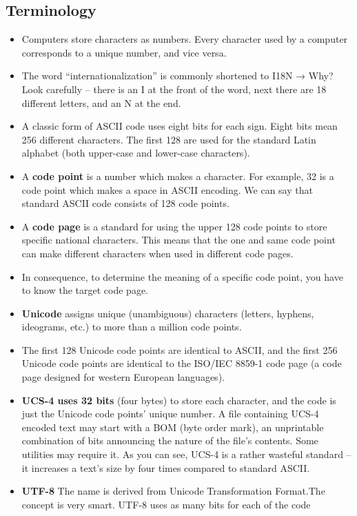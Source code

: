 \documentclass[11pt]{article}
\begin{document}
\subsection{Terminology}
\label{sec:orgfbbca46}
\begin{itemize}
\item Computers store characters as numbers. Every character used by a
computer corresponds to a unique number, and vice versa.
\item The word “internationalization” is commonly shortened to I18N → Why?
Look carefully – there is an I at the front of the word, next there
are 18 different letters, and an N at the end.
\item A classic form of ASCII code uses eight bits for each sign. Eight
bits mean 256 different characters. The first 128 are used for the
standard Latin alphabet (both upper-case and lower-case characters).
\item A \textbf{code point} is a number which makes a character. For example, 32
is a code point which makes a space in ASCII encoding. We can say
that standard ASCII code consists of 128 code points.
\item A \textbf{code page} is a standard for using the upper 128 code points to
store specific national characters. This means that the one and same
code point can make different characters when used in different code
pages.
\item In consequence, to determine the meaning of a specific code point,
you have to know the target code page.
\item \textbf{Unicode} assigns unique (unambiguous) characters (letters, hyphens,
ideograms, etc.) to more than a million code points.
\item The first 128 Unicode code points are identical to ASCII, and the
first 256 Unicode code points are identical to the ISO/IEC 8859-1
code page (a code page designed for western European languages).
\item \textbf{UCS-4 uses 32 bits} (four bytes) to store each character, and the
code is just the Unicode code points’ unique number. A file
containing UCS-4 encoded text may start with a BOM (byte order
mark), an unprintable combination of bits announcing the nature of
the file’s contents. Some utilities may require it. As you can see,
UCS-4 is a rather wasteful standard – it increases a text’s size by
four times compared to standard ASCII.
\item \textbf{UTF-8} The name is derived from Unicode Transformation Format.The
concept is very smart. UTF-8 uses as many bits for each of the code

\end{itemize}
\end{document}
